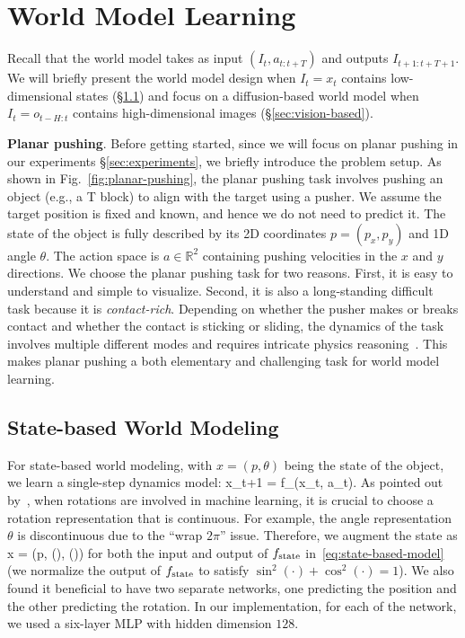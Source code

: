 





\section{World Model Learning}
\label{sec:world-model}

Recall that the world model takes as input $(I_t, a_{t:t+T})$ and outputs $I_{t+1:t+T+1}$. We will briefly present the world model design when $I_t = x_t$ contains low-dimensional states (\S\ref{sec:state-based}) and focus on a diffusion-based world model when $I_t = o_{t-H:t}$ contains high-dimensional images (\S\ref{sec:vision-based}). 

\textbf{Planar pushing}. Before getting started, since we will focus on planar pushing in our experiments \S\ref{sec:experiments}, we briefly introduce the problem setup. As shown in Fig.~\ref{fig:planar-pushing}, the planar pushing task involves pushing an object (e.g., a T block) to align with the target using a pusher. We assume the target position is fixed and known, and hence we do not need to predict it. The state of the object is fully described by its 2D coordinates $p=(p_x, p_y)$ and 1D angle $\theta$. The action space is $a \in \mathbb{R}^2$ containing pushing velocities in the $x$ and $y$ directions. We choose the planar pushing task for two reasons. First, it is easy to understand and simple to visualize. Second, it is also a long-standing difficult task because it is \emph{contact-rich}. Depending on whether the pusher makes or breaks contact and whether the contact is sticking or sliding, the dynamics of the task involves multiple different modes and requires intricate physics reasoning~\cite{hogan2020feedback}. This makes planar pushing a both elementary and challenging task for world model learning.



\subsection{State-based World Modeling}
\label{sec:state-based}

For state-based world modeling, with $x = (p,\theta)$ being the state of the object, we learn a single-step dynamics model:
\bea \label{eq:state-based-model}
x_{t+1} = f_\state(x_t, a_t).
\eea
As pointed out by~\cite{zhou2019continuity}, when rotations are involved in machine learning, it is crucial to choose a rotation representation that is continuous. For example, the angle representation $\theta$ is discontinuous due to the ``wrap $2\pi$'' issue. Therefore, we augment the state as
\bea 
x = (p, \cos(\theta), \sin(\theta))
\eea
for both the input and output of $f_{\text{state}}$ in~\eqref{eq:state-based-model} (we normalize the output of $f_{\text{state}}$ to satisfy $\sin^2(\cdot) + \cos^2(\cdot)=1$). We also found it beneficial to have two separate networks, one predicting the position and the other predicting the rotation. In our implementation, for each of the network, we used a six-layer MLP with hidden dimension $128$. 

